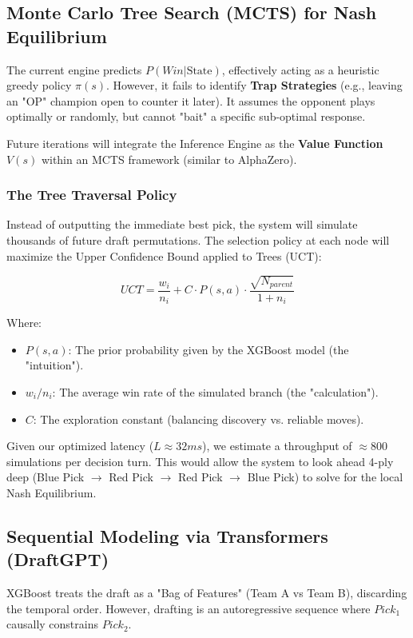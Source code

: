 \documentclass[12pt, a4paper]{article}
\begin{document}
    \subsection{Monte Carlo Tree Search (MCTS) for Nash Equilibrium}
    The current engine predicts $P(Win | \text{State})$, effectively acting as a heuristic greedy policy $\pi(s)$. However, it fails to identify \textbf{Trap Strategies} (e.g., leaving an "OP" champion open to counter it later). It assumes the opponent plays optimally or randomly, but cannot "bait" a specific sub-optimal response.

    Future iterations will integrate the Inference Engine as the \textbf{Value Function} $V(s)$ within an MCTS framework (similar to AlphaZero).

    \subsubsection{The Tree Traversal Policy}
    Instead of outputting the immediate best pick, the system will simulate thousands of future draft permutations. The selection policy at each node will maximize the Upper Confidence Bound applied to Trees (UCT):

    \begin{equation}
        UCT = \frac{w_i}{n_i} + C \cdot P(s, a) \cdot \frac{\sqrt{N_{parent}}}{1 + n_i}
    \end{equation}

    Where:
    \begin{itemize}
        \item $P(s, a)$: The prior probability given by the XGBoost model (the "intuition").
        \item $w_i/n_i$: The average win rate of the simulated branch (the "calculation").
        \item $C$: The exploration constant (balancing discovery vs. reliable moves).
    \end{itemize}

    Given our optimized latency ($L \approx 32ms$), we estimate a throughput of $\approx 800$ simulations per decision turn. This would allow the system to look ahead 4-ply deep (Blue Pick $\rightarrow$ Red Pick $\rightarrow$ Red Pick $\rightarrow$ Blue Pick) to solve for the local Nash Equilibrium.

    \subsection{Sequential Modeling via Transformers (DraftGPT)}
    XGBoost treats the draft as a "Bag of Features" (Team A vs Team B), discarding the temporal order. However, drafting is an autoregressive sequence where $Pick_1$ causally constrains $Pick_2$.
\end{document}
